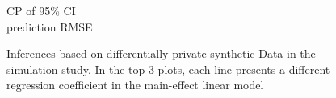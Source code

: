 \documentclass[12pt, A4]{article}
\theoremstyle{plain}
\theoremstyle{exampstyle}\newtheorem{defn}{Definition}
\theoremstyle{exampstyle}\newtheorem{lem}{Lemma}
\theoremstyle{exampstyle}\newtheorem{cor}{Corollary}
\theoremstyle{exampstyle}\newtheorem{pro}{Proposition}
\theoremstyle{exampstyle}\newtheorem{cla}{Claim}
\theoremstyle{exampstyle}\newtheorem{rem}{Remark}
\begin{document}
\begin{figure}[!htb]
\small{CP of 95\% CI$\;\quad$}
\\
\small{prediction RMSE}
\vspace{-9pt}
\caption{Inferences based on differentially private synthetic Data in the simulation study. In the top 3 plots, each line presents a different regression coefficient in the main-effect linear model}\label{fig:maineffect}\vspace{-12pt}
\end{figure}
\end{document}
